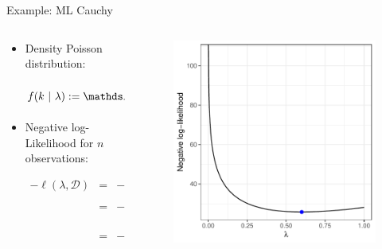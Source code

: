 \documentclass[11pt,compress,t,notes=noshow, xcolor=table]{beamer}
\begin{document}
\begin{vbframe}{Example: ML Cauchy}


\begin{columns}
\begin{column}{0.5\textwidth}
\begin{itemize}
\item Density Poisson distribution:
\begin{footnotesize}
$$
f(k ~|~ \lambda) := \P(x = k) = \frac{\lambda^k \cdot \exp(-\lambda)}{k!}
$$
\end{footnotesize}
\item Negative log-Likelihood for $n$ observations:
\begin{footnotesize}
\begin{eqnarray*}
- \ell(\lambda, \mathcal{D}) &=& - \log L(\lambda, \mathcal{D}) \\ &=& - \log \prod_{i = 1}^n  f\left(x^{(i)} ~|~ \lambda\right) \\ &=&  - \sum_{i = 1}^n \frac{\lambda^{x^{(i)} } \cdot \exp(-\lambda)}{x^{(i)} !} 
\end{eqnarray*}
\end{footnotesize}

\end{itemize}
\end{column}
\begin{column}{0.5\textwidth}
\begin{figure}
  \includegraphics[width = 1\textwidth]{figure_man/poisson.pdf}
\end{figure}
\end{column}
\end{columns}




\end{vbframe}
\end{document}

